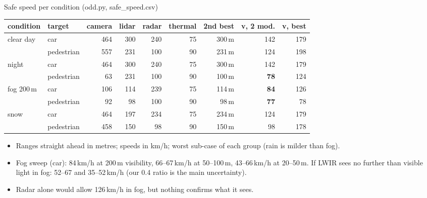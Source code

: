\documentclass[aspectratio=169,11pt]{beamer}
\begin{document}
\begin{frame}{Safe speed per condition (odd.py, safe\_speed.csv)}
  \footnotesize
  \centering
  \renewcommand{\arraystretch}{1.12}
  \begin{tabular}{@{}llrrrrrrr@{}}
    \toprule
    condition & target & camera & lidar & radar & thermal & 2nd best & v, 2 mod. & v, best \\
    \midrule
    clear day & car & 464 & 300 & 240 & 75 & 300\,m & 142 & 179 \\
     & pedestrian & 557 & 231 & 100 & 90 & 231\,m & 124 & 198 \\
    night & car & 464 & 300 & 240 & 75 & 300\,m & 142 & 179 \\
     & pedestrian & 63 & 231 & 100 & 90 & 100\,m & \textbf{78} & 124 \\
    fog 200\,m & car & 106 & 114 & 239 & 75 & 114\,m & \textbf{84} & 126 \\
     & pedestrian & 92 & 98 & 100 & 90 & 98\,m & \textbf{77} & 78 \\
    snow & car & 464 & 197 & 234 & 75 & 234\,m & 124 & 179 \\
     & pedestrian & 458 & 150 & 98 & 90 & 150\,m & 98 & 178 \\
    \bottomrule
  \end{tabular}

  \vspace{0.6em}
  \raggedright
  \begin{itemize}
    \item Ranges straight ahead in metres; speeds in km/h; worst sub-case of each group (rain is milder than fog).
    \item Fog sweep (car): 84\,km/h at 200\,m visibility, 66--67\,km/h at 50--100\,m, 43--66\,km/h at 20--50\,m.
      If LWIR sees no further than visible light in fog: 52--67 and 35--52\,km/h (our 0.4 ratio is the main uncertainty).
    \item Radar alone would allow 126\,km/h in fog, but nothing confirms what it sees.
  \end{itemize}
\end{frame}
\end{document}
